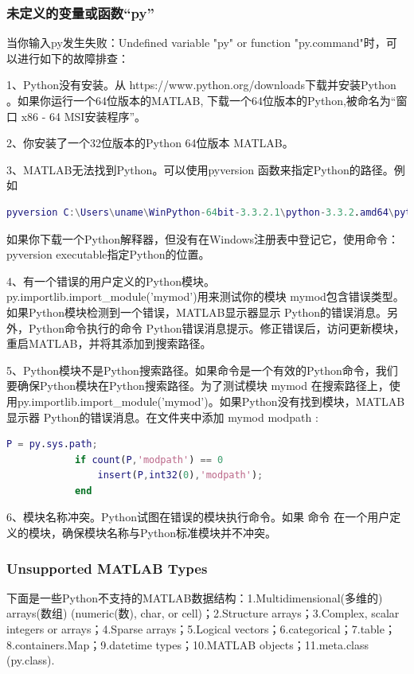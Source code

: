         \subsubsection{未定义的变量或函数“py”}
            \par
            当你输入py发生失败：Undefined variable "py" or function "py.command"时，可以进行如下的故障排查：
            \par
            1、Python没有安装。从 https://www.python.org/downloads下载并安装Python 。如果你运行一个64位版本的MATLAB, 下载一个64位版本的Python,被命名为“窗口 x86 - 64 MSI安装程序”。
            \par
            2、你安装了一个32位版本的Python 64位版本 MATLAB。
            \par
            3、MATLAB无法找到Python。可以使用pyversion 函数来指定Python的路径。例如
            \begin{lstlisting}[language = Matlab]
            pyversion C:\Users\uname\WinPython-64bit-3.3.2.1\python-3.3.2.amd64\python.exe
            \end{lstlisting}如果你下载一个Python解释器，但没有在Windows注册表中登记它，使用命令：pyversion executable指定Python的位置。
            \par
            4、有一个错误的用户定义的Python模块。 py.importlib.import\_module('mymod')用来测试你的模块 mymod包含错误类型。如果Python模块检测到一个错误，MATLAB显示器显示 Python的错误消息。另外，Python命令执行的命令 Python错误消息提示。修正错误后，访问更新模块，重启MATLAB，并将其添加到搜索路径。
            \par
            5、Python模块不是Python搜索路径。如果命令是一个有效的Python命令，我们要确保Python模块在Python搜索路径。为了测试模块 mymod 在搜索路径上，使用py.importlib.import\_module('mymod')。如果Python没有找到模块，MATLAB显示器 Python的错误消息。在文件夹中添加 mymod modpath :
            \begin{lstlisting}[language = Matlab]
            P = py.sys.path;
            if count(P,'modpath') == 0
                insert(P,int32(0),'modpath');
            end
            \end{lstlisting}
            \par
            6、模块名称冲突。Python试图在错误的模块执行命令。如果 命令 在一个用户定义的模块，确保模块名称与Python标准模块并不冲突。
        \subsubsection{Unsupported MATLAB Types}
            \par
            下面是一些Python不支持的MATLAB数据结构：1.Multidimensional(多维的) arrays(数组) (numeric(数), char, or cell)；2.Structure arrays；3.Complex, scalar integers or arrays；4.Sparse arrays；5.Logical vectors；6.categorical；7.table；8.containers.Map；9.datetime types；10.MATLAB objects；11.meta.class (py.class).
